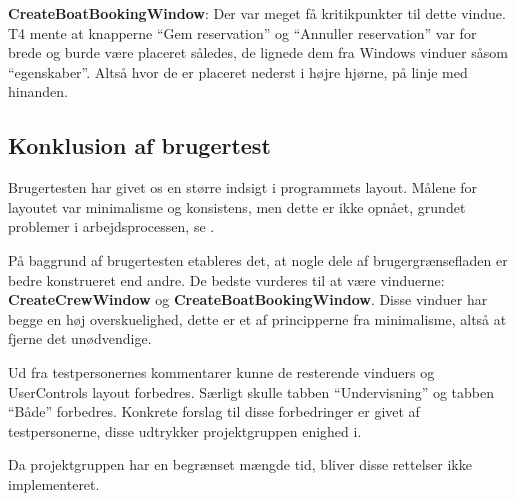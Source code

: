 \textbf{CreateBoatBookingWindow}:
Der var meget få kritikpunkter til dette vindue.
T4 mente at knapperne ``Gem reservation'' og ``Annuller reservation'' var for brede og burde være placeret således, de lignede dem fra Windows vinduer såsom ``egenskaber''. 
Altså hvor de er placeret nederst i højre hjørne, på linje med hinanden. 

\subsection{Konklusion af brugertest}
Brugertesten har givet os en større indsigt i programmets layout.
Målene for layoutet var minimalisme og konsistens, men dette er ikke opnået, grundet problemer i arbejdsprocessen, se . 

På baggrund af brugertesten etableres det, at nogle dele af brugergrænsefladen er bedre konstrueret end andre.
De bedste vurderes til at være vinduerne: \textbf{CreateCrewWindow} og \textbf{CreateBoatBookingWindow}. 
Disse vinduer har begge en høj overskuelighed, dette er et af principperne fra minimalisme, altså at fjerne det unødvendige. 

Ud fra testpersonernes kommentarer kunne de resterende vinduers og UserControls layout forbedres. 
Særligt skulle tabben ``Undervisning'' og tabben ``Både'' forbedres.
Konkrete forslag til disse forbedringer er givet af testpersonerne, disse udtrykker projektgruppen enighed i. 

Da projektgruppen har en begrænset mængde tid, bliver disse rettelser ikke implementeret. 
